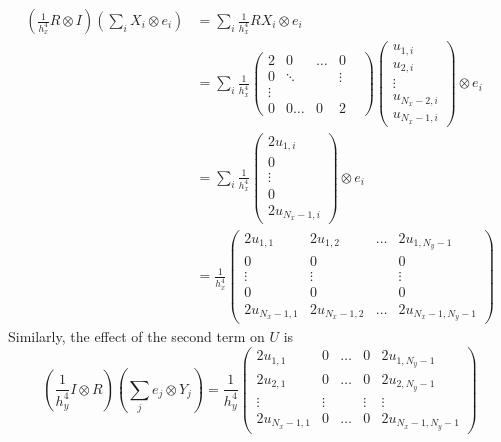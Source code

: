 \documentclass[reqno]{article}
\begin{document}
	\begin{equation}
	\begin{split}
		\left( \frac{1}{h_x^4} R\otimes I \right)
		\left( \sum_i X_i \otimes e_i \right) &=
		\sum_i \frac{1}{h_x^4} R X_i \otimes e_i\\ &=
		\sum_i \frac{1}{h_x^4} 
		\begin{pmatrix}
			2 &0 &\ldots &0 \\
			0 &\ddots & &\vdots \\
			\vdots & & & & \\
			0 &0 \ldots &0 &2
		\end{pmatrix}
		\begin{pmatrix}
			u_{1, i}\\
			u_{2, i} \\
			\vdots \\
			u_{N_x - 2, i}\\
			u_{N_x - 1, i}
		\end{pmatrix}
		\otimes e_i
		\\
		&= \sum_i \frac{1}{h_x^4} 
		\begin{pmatrix}
			2 u_{1, i}\\
			0 \\
			\vdots \\
			0\\
			2 u_{N_x - 1, i}
		\end{pmatrix}
		\otimes e_i \\
		&=
		\frac{1}{h_x^4}
		\begin{pmatrix}
			2u_{1, 1} &2u_{1, 2} &\ldots &2u_{1, N_y - 1} \\
			0 &0 & &0 \\
			\vdots &\vdots & &\vdots \\
			0 &0 & &0 \\
			2u_{N_x - 1, 1} &2u_{N_x - 1, 2} &\ldots &2u_{N_x - 1, N_y - 1}
		\end{pmatrix}
	\end{split}
	\end{equation}
	Similarly, the effect of the second term on $U$ is
	\begin{equation}
		\left( \frac{1}{h_y^4} I \otimes R \right)
		\left( \sum_j e_j \otimes Y_j \right) = 
		\frac{1}{h_y^4}
		\begin{pmatrix}
			2u_{1, 1} &0 &\ldots &0 &2u_{1, N_y - 1} \\
			2u_{2, 1} &0 &\ldots &0 &2u_{2, N_y - 1} \\
			\vdots &\vdots & &\vdots &\vdots \\
			2u_{N_x - 1, 1} &0 &\ldots &0 &2u_{N_x - 1, N_y - 1}
		\end{pmatrix}
	\end{equation}
\end{document}
